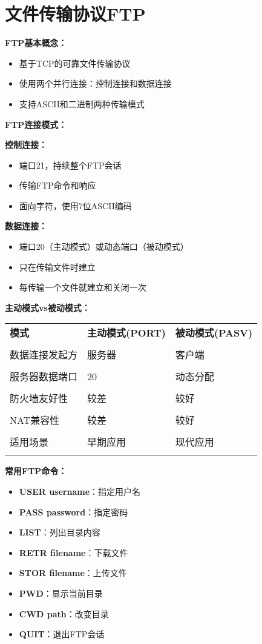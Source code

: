\documentclass[lang=cn,newtx,10pt,scheme=chinese]{../../elegantbook}
\begin{document}
\section{文件传输协议FTP}

\textbf{FTP基本概念：}
\begin{itemize}
  \item 基于TCP的可靠文件传输协议
  \item 使用两个并行连接：控制连接和数据连接
  \item 支持ASCII和二进制两种传输模式
\end{itemize}

\textbf{FTP连接模式：}

\textbf{控制连接：}
\begin{itemize}
  \item 端口21，持续整个FTP会话
  \item 传输FTP命令和响应
  \item 面向字符，使用7位ASCII编码
\end{itemize}

\textbf{数据连接：}
\begin{itemize}
  \item 端口20（主动模式）或动态端口（被动模式）
  \item 只在传输文件时建立
  \item 每传输一个文件就建立和关闭一次
\end{itemize}

\textbf{主动模式vs被动模式：}
\begin{longtable}{@{}p{3cm}p{5cm}p{5cm}@{}}
\toprule
\textbf{模式} & \textbf{主动模式(PORT)} & \textbf{被动模式(PASV)} \\\\ \midrule
\endhead

数据连接发起方 & 服务器 & 客户端 \\\\
服务器数据端口 & 20 & 动态分配 \\\\
防火墙友好性 & 较差 & 较好 \\\\
NAT兼容性 & 较差 & 较好 \\\\
适用场景 & 早期应用 & 现代应用 \\\\

\bottomrule
\end{longtable}

\textbf{常用FTP命令：}
\begin{itemize}
  \item \textbf{USER username}：指定用户名
  \item \textbf{PASS password}：指定密码
  \item \textbf{LIST}：列出目录内容
  \item \textbf{RETR filename}：下载文件
  \item \textbf{STOR filename}：上传文件
  \item \textbf{PWD}：显示当前目录
  \item \textbf{CWD path}：改变目录
  \item \textbf{QUIT}：退出FTP会话
\end{itemize}
\end{document}
